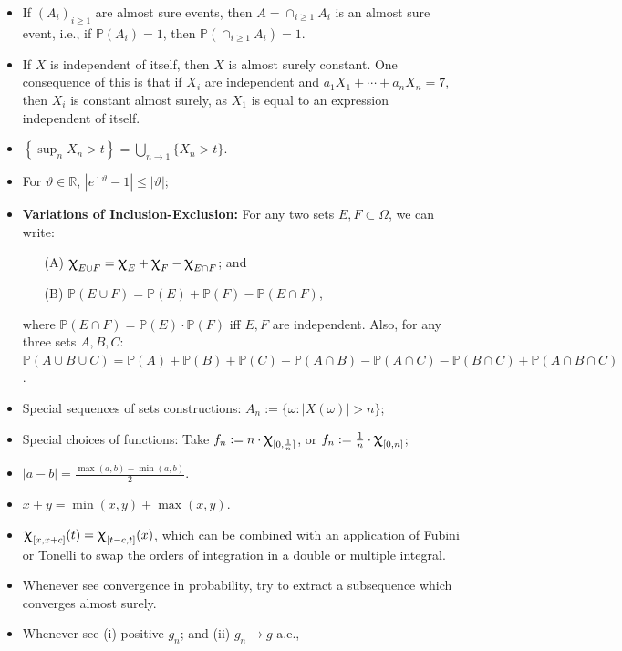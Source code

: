 \documentclass[12pt,reqno]{article}
\theoremstyle{plain}
\theoremstyle{definition}
\newcommand{\PP}[1]{\ensuremath{\mathbb{P}\left(#1\right)}}
\renewcommand{\chi}{\scalebox{1.25}{$\upchi$}}
\begin{document}
\begin{itemize} 

\item If $(A_i)_{i \geq 1}$ are almost sure events, then 
     $A = \cap_{i \geq 1} A_i$ is an almost sure event, i.e., 
     if $\mathbb{P}(A_i) = 1$, then $\mathbb{P}\left( 
     \cap_{i \geq 1} A_i\right) = 1$.
\item If $X$ is independent of itself, then $X$ is almost surely constant. 
     One consequence of this is that if $X_i$ are independent and 
     $a_1X_1+\cdots+a_nX_n = 7$, then $X_i$ is constant almost surely, 
     as $X_1$ is equal to an expression independent of itself. 
\item $\left\{\sup_n X_n > t\right\} = \bigcup_{n \rightarrow 1} \{X_n > t\}$. 
\item For $\vartheta \in \mathbb{R}$, $|e^{\imath\vartheta} - 1| \leq |\vartheta|$; 
\item \textbf{Variations of Inclusion-Exclusion:} For any two sets $E,F \subset \Omega$, 
     we can write:
     \begin{itemize} 
     \item[(A)] $\chi_{E \cup F} = \chi_E + \chi_F - \chi_{E \cap F}$; and 
     \item[(B)] $\PP{E \cup F} = \PP{E} + \PP{F} - \PP{E \cap F}$, 
     \end{itemize} 
     where $\PP{E \cap F} = \PP{E} \cdot \PP{F}$ iff $E,F$ are independent. 
     Also, for any three sets $A,B,C$: 
     $\PP{A \cup B \cup C} = \PP{A}+\PP{B}+\PP{C} - \PP{A \cap B} - \PP{A \cap C} - 
      \PP{B \cap C} + \PP{A \cap B \cap C}$. 
\item Special sequences of sets constructions: $A_n := \{\omega: |X(\omega)| > n\}$; 
\item Special choices of functions: Take $f_n := n \cdot \chi_{[0,\frac{1}{n}]}$, or 
     $f_n := \frac{1}{n} \cdot \chi_{[0,n]}$; 
\item $|a-b| = \frac{\max(a, b) - \min(a, b)}{2}$. 
\item $x+y = \min(x, y) + \max(x, y)$. 
\item $\chi_{[x,x+c]}(t) = \chi_{[t-c,t]}(x)$, which can be combined with an application of 
     Fubini or Tonelli to swap the orders of integration in a double or multiple integral. 
\item Whenever see convergence in probability, try to extract a subsequence which converges 
     almost surely. 
\item Whenever see (i) positive $g_n$; and (ii) $g_n \rightarrow g$ a.e., 

\end{itemize}
\end{document}
